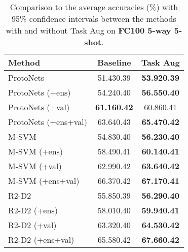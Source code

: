 \documentclass[10pt,twocolumn,letterpaper]{article}
\begin{document}
\begin{table}[t]
\caption{Comparison to the average accuracies (\%) with 95\% confidence intervals between the methods with and without Task Aug on \textbf{FC100 5-way 5-shot}.}
\label{FC100_5shot}
\begin{center}
\begin{tabular}{lcc}
\toprule[1pt]
\textbf{Method} & Baseline & Task Aug \\
\hline
ProtoNets~\cite{snell2017prototypical} & 51.430.39 & \textbf{53.920.39}\\
ProtoNets (+ens) & 54.240.40 & \textbf{56.550.40}\\
ProtoNets (+val) & \textbf{61.160.42} & 60.860.41\\
ProtoNets (+ens+val) & 63.640.43 & \textbf{65.470.42}\\
\hline
M-SVM~\cite{lee2019meta} & 54.830.40 & \textbf{56.230.40}\\
M-SVM (+ens) & 58.490.41 & \textbf{60.140.41}\\
M-SVM (+val) & 62.990.42 & \textbf{63.640.42}\\
M-SVM (+ens+val) & 66.370.42 & \textbf{67.170.41}\\
\hline
R2-D2~\cite{bertinetto2018meta} & 55.850.39 & \textbf{56.290.40}\\
R2-D2 (+ens) & 58.010.40 & \textbf{59.940.41}\\
R2-D2 (+val) & 63.320.40 & \textbf{64.530.42}\\
R2-D2 (+ens+val) & 65.580.42 & \textbf{67.660.42}\\
\bottomrule[1pt]
\end{tabular}
\end{center}
\end{table}
\end{document}
